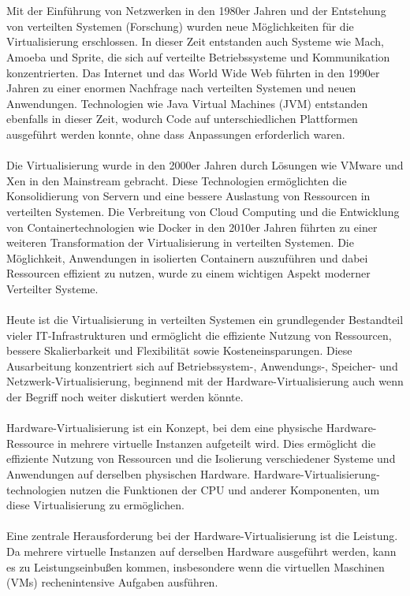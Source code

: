 \documentclass[../vs-script-first-v01.tex]{subfiles}
\begin{document}
\\\\
Mit der Einführung von Netzwerken in den 1980er Jahren und der Entstehung von verteilten Systemen (Forschung) wurden neue Möglichkeiten für die Virtualisierung erschlossen. In dieser Zeit entstanden auch Systeme wie Mach, Amoeba und Sprite, die sich auf verteilte Betriebssysteme und Kommunikation konzentrierten. Das Internet und das World Wide Web führten in den 1990er Jahren zu einer enormen Nachfrage nach verteilten Systemen und neuen Anwendungen. Technologien wie Java Virtual Machines (JVM) entstanden ebenfalls in dieser Zeit, wodurch Code auf unterschiedlichen Plattformen ausgeführt werden konnte, ohne dass Anpassungen erforderlich waren.
\\\\
Die Virtualisierung wurde in den 2000er Jahren durch Lösungen wie VMware und Xen in den Mainstream gebracht. Diese Technologien ermöglichten die Konsolidierung von Servern und eine bessere Auslastung von Ressourcen in verteilten Systemen. Die Verbreitung von Cloud Computing und die Entwicklung von Containertechnologien wie Docker in den 2010er Jahren führten zu einer weiteren Transformation der Virtualisierung in verteilten Systemen. Die Möglichkeit, Anwendungen in isolierten Containern auszuführen und dabei Ressourcen effizient zu nutzen, wurde zu einem wichtigen Aspekt moderner Verteilter Systeme.
\\\\
Heute ist die Virtualisierung in verteilten Systemen ein grundlegender Bestandteil vieler IT-Infrastrukturen und ermöglicht die effiziente Nutzung von Ressourcen, bessere Skalierbarkeit und Flexibilität sowie Kosteneinsparungen. Diese Ausarbeitung konzentriert sich auf Betriebssystem-, Anwendungs-, Speicher- und Netzwerk-Virtualisierung, beginnend mit der Hardware-Virtualisierung auch wenn der Begriff noch weiter diskutiert werden könnte. 
\\\\
Hardware-Virtualisierung ist ein Konzept, bei dem eine physische Hardware-Ressource in mehrere virtuelle Instanzen aufgeteilt wird. Dies ermöglicht die effiziente Nutzung von Ressourcen und die Isolierung verschiedener Systeme und Anwendungen auf derselben physischen Hardware. Hardware-Virtualisierung-technologien nutzen die Funktionen der CPU und anderer Komponenten, um diese Virtualisierung zu ermöglichen.
\\\\
Eine zentrale Herausforderung bei der Hardware-Virtualisierung ist die Leistung. Da mehrere virtuelle Instanzen auf derselben Hardware ausgeführt werden, kann es zu Leistungseinbußen kommen, insbesondere wenn die virtuellen Maschinen (VMs) rechenintensive Aufgaben ausführen.
\end{document}
